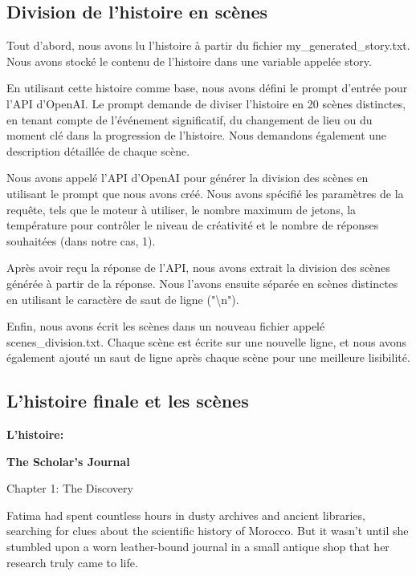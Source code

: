 \documentclass[11,5pt]{report}
\begin{document}
\begin{spacing}{2}
\subsection{Division de l'histoire en scènes}
Tout d'abord, nous avons lu l'histoire à partir du fichier my\_generated\_story.txt. Nous avons stocké le contenu de l'histoire dans une variable appelée story.

En utilisant cette histoire comme base, nous avons défini le prompt d'entrée pour l'API d'OpenAI\cite{OpenAIDocs}. Le prompt demande de diviser l'histoire en 20 scènes distinctes, en tenant compte de l'événement significatif, du changement de lieu ou du moment clé dans la progression de l'histoire. Nous demandons également une description détaillée de chaque scène.

Nous avons appelé l'API d'OpenAI\cite{OpenAIDocs} pour générer la division des scènes en utilisant le prompt que nous avons créé. Nous avons spécifié les paramètres de la requête, tels que le moteur à utiliser, le nombre maximum de jetons, la température pour contrôler le niveau de créativité et le nombre de réponses souhaitées (dans notre cas, 1).

Après avoir reçu la réponse de l'API, nous avons extrait la division des scènes générée à partir de la réponse. Nous l'avons ensuite séparée en scènes distinctes en utilisant le caractère de saut de ligne ("\textbackslash n").

Enfin, nous avons écrit les scènes dans un nouveau fichier appelé scenes\_division.txt. Chaque scène est écrite sur une nouvelle ligne, et nous avons également ajouté un saut de ligne après chaque scène pour une meilleure lisibilité.

\vspace{1cm}
\subsection{L'histoire finale et les scènes}

\textbf{L'histoire:}

\begin{center}
\textbf{The Scholar's Journal}
\end{center}


Chapter 1: The Discovery

Fatima had spent countless hours in dusty archives and ancient libraries, searching for clues about the scientific history of Morocco. But it wasn't until she stumbled upon a worn leather-bound journal in a small antique shop that her research truly came to life.


\end{spacing}
\end{document}
